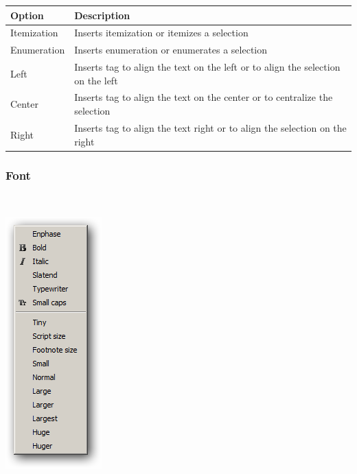 \begin{scriptsize}\begin{tabularx}{\textwidth}{>{\hsize=0.2\hsize}X>{\hsize=0.8\hsize}X}\\
    \hline
    \textbf{Option} & \textbf{Description} \\
    \hline
    Itemization & Inserts itemization or itemizes a selection \\
    Enumeration & Inserts enumeration or enumerates a selection \\
    Left & Inserts tag to align the text on the left or to align the selection on the left \\
    Center & Inserts tag to align the text on the center or to centralize the selection \\
    Right & Inserts tag to align the text right or to align the selection on the right \\
    \hline
  \end{tabularx}\end{scriptsize}


\hypertarget{menu_insert_latex_font}{}
\subsubsection{Font}\\

\includegraphics[scale=0.50]{./res/menu_insert_latex_font.png}\\

